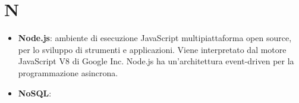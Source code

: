 \section{N}
\begin{itemize}
	\item \textbf{Node.js}: ambiente di esecuzione JavaScript multipiattaforma open source, per lo sviluppo di strumenti e applicazioni. Viene interpretato dal motore JavaScript V8 di Google Inc. Node.js ha un'architettura event-driven per la programmazione asincrona.
	\item \textbf{NoSQL}:
\end{itemize}